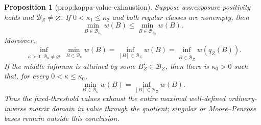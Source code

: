 \documentclass{article}
\newtheorem{proposition}{Proposition}
\begin{document}
\begin{proposition}[prop:kappa-value-exhaustion]\label{prop:kappa-value-exhaustion}
Suppose ass:exposure-positivity holds and \(\mathcal B_Z\ne\varnothing\).  If \(0<\kappa_1\le\kappa_2\) and both regular classes are nonempty, then
\[
\min_{B\in\mathcal B_{\kappa_1}}w(B)
\le
\min_{B\in\mathcal B_{\kappa_2}}w(B).
\]
Moreover,
\[
\inf_{\substack{\kappa>0:\,\mathcal B_\kappa\ne\varnothing}}
\min_{B\in\mathcal B_\kappa}w(B)
=
\inf_{[B]\in\mathcal B_Z}w(B)
=
\inf_{B\in\widetilde{\mathcal B}_Z}w(q_Z(B)).
\]
If the middle infimum is attained by some \(B_Z^\star\in\mathcal B_Z\), then there is \(\kappa_0>0\) such that, for every \(0<\kappa\le\kappa_0\),
\[
\min_{B\in\mathcal B_\kappa}w(B)=\inf_{[B]\in\mathcal B_Z}w(B).
\]
Thus the fixed-threshold values exhaust the entire maximal well-defined ordinary-inverse matrix domain in value through the quotient; singular or Moore--Penrose bases remain outside this conclusion.
\end{proposition}
\end{document}
